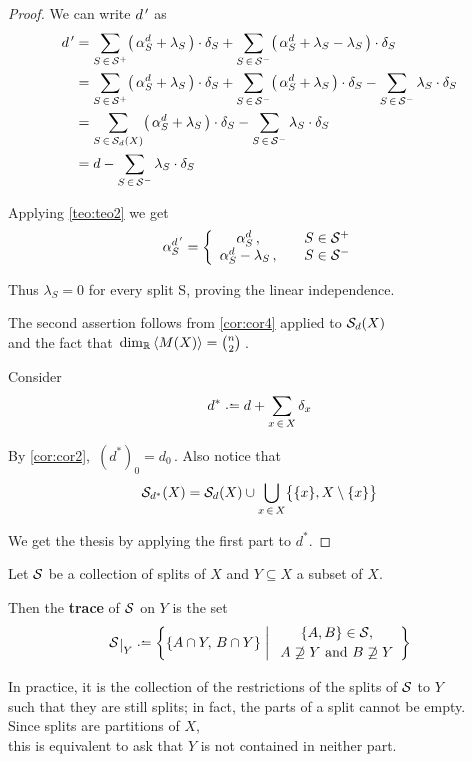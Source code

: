 \documentclass[./main.tex]{subfiles}
\begin{document}
\begin{proof}
    We can write ${d^{\,\prime}}$ as
    \begin{align*}
        {d^{\,\prime}} &= \sum_{S \,\in\, {\mathcal{S}}^+} \bigl(\, \alpha_S^d + \lambda_S \,\bigr) \cdot \delta_S + \sum_{S \,\in\, {\mathcal{S}}^-} \bigl(\, \alpha_S^d + \lambda_S - \lambda_S \,\bigr) \cdot \delta_S \\
        &= \sum_{S \,\in\, {\mathcal{S}}^+} \bigl(\, \alpha_S^d + \lambda_S \,\bigr) \cdot \delta_S + \sum_{S \,\in\, {\mathcal{S}}^-} \bigl(\, \alpha_S^d + \lambda_S \,\bigr) \cdot \delta_S - \sum_{S \,\in\, {\mathcal{S}}^-} \lambda_S \cdot \delta_S  \\
        &= \sum_{S \,\in\, {\mathcal{S}}_d(X)} \bigl(\, \alpha_S^d + \lambda_S \,\bigr) \cdot \delta_S - \sum_{S \,\in\, {\mathcal{S}}^-} \lambda_S \cdot \delta_S \\
        &= d - \sum_{S \,\in\, {\mathcal{S}}^-} \lambda_S \cdot \delta_S
    \end{align*}
    
    Applying \autoref{teo:teo2} we get
    \[ \alpha_S^{d^{\,\prime}} = \bigg\{
        \begin{array}{cl}
            \alpha_S^d \,,              & \quad S \in {\mathcal{S}}^+ \\
            \alpha_S^d - \lambda_S \,,  & \quad S \in {\mathcal{S}}^-
        \end{array}
    \]

    Thus $\lambda_S = 0$ for every split S, proving the linear independence.
    
    The second assertion follows from \autoref{cor:cor4} applied to ${\mathcal{S}}_d(X)$ \\[1pt]
    and the fact that $\, \dim_{\mathbb{R}} \left\langle M(X)\right\rangle = \binom{n}{2} \,$. \bigskip \medskip

    Consider
    \[ d^* \defeq d + \sum_{x \,\in\, X} \delta_x \nospabv \nospblw \]

    By \autoref{cor:cor2}, $\, (d^*)_0 = d_0 \,$. Also notice that
    \[ {\mathcal{S}}_{d^*}(X) = {\mathcal{S}}_d(X) \cup \bigcup_{x \,\in\, X} \bigl\{ \{x\}, X \setminus \{x\} \bigr\} \]

    We get the thesis by applying the first part to $d^*$.
\end{proof}

\clearpage

\begin{definition}[trace]
    Let ${\mathcal{S}}$ be a collection of splits of $X$ and $Y \subseteq X$ a subset of $X$.
    
    Then the \textbf{trace} of ${\mathcal{S}}$ on $Y$ is the set
    \[ \restr{\Sc}{Y} \defeq \biggl\{ \{A \cap Y,\, B \cap Y\} \mathrel{\bigg{|}}
        \begin{array}{c}
             \{A,B\} \in \Sc, \\[2pt]
             A \not\supseteq Y \ \text{and}\ B \not\supseteq Y
        \end{array}
    \biggr\} \]
\end{definition}
In practice, it is the collection of the restrictions of the splits of ${\mathcal{S}}$ to $Y$ \\
\bsp such that they are still splits; in fact, the parts of a split cannot be empty. \\
Since splits are partitions of $X$, \\
\bsp this is equivalent to ask that $Y$ is not contained in neither part.
\end{document}
